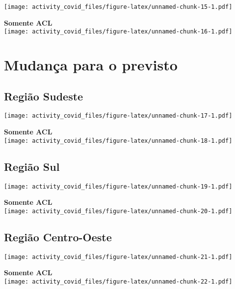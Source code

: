 \documentclass[
]{article}
\begin{document}
\texttt{[image: activity\_covid\_files/figure-latex/unnamed-chunk-15-1.pdf]}

\pagebreak

\textbf{Somente ACL}\\
\texttt{[image: activity\_covid\_files/figure-latex/unnamed-chunk-16-1.pdf]}

\hypertarget{mudanuxe7a-para-o-previsto}{%
\section{Mudança para o previsto}\label{mudanuxe7a-para-o-previsto}}

\hypertarget{regiuxe3o-sudeste-2}{%
\subsection{Região Sudeste}\label{regiuxe3o-sudeste-2}}

\texttt{[image: activity\_covid\_files/figure-latex/unnamed-chunk-17-1.pdf]}

\pagebreak

\textbf{Somente ACL}\\
\texttt{[image: activity\_covid\_files/figure-latex/unnamed-chunk-18-1.pdf]}

\pagebreak

\hypertarget{regiuxe3o-sul-2}{%
\subsection{Região Sul}\label{regiuxe3o-sul-2}}

\texttt{[image: activity\_covid\_files/figure-latex/unnamed-chunk-19-1.pdf]}

\pagebreak

\textbf{Somente ACL}\\
\texttt{[image: activity\_covid\_files/figure-latex/unnamed-chunk-20-1.pdf]}

\pagebreak

\hypertarget{regiuxe3o-centro-oeste-2}{%
\subsection{Região Centro-Oeste}\label{regiuxe3o-centro-oeste-2}}

\texttt{[image: activity\_covid\_files/figure-latex/unnamed-chunk-21-1.pdf]}

\pagebreak

\textbf{Somente ACL}\\
\texttt{[image: activity\_covid\_files/figure-latex/unnamed-chunk-22-1.pdf]}
\end{document}
